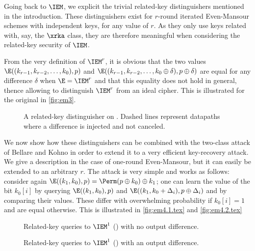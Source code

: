 Going back to $\IEM$, we explicit the
trivial related-key distinguishers mentioned in the introduction. These distinguishers exist
for $r$-round iterated Even-Mansour schemes with independent keys, for any value of $r$.
As they only use keys related with, say, the $\xrka$ class,
they are therefore meaningful when considering the related-key security of $\IEM$.

From the very definition of $\IEM^r$, it
is obvious that the two values $\E((k_{r-1}, k_{r-2},\linebreak[1] \ldots, k_0), p)$
and $\E((k_{r-1}, k_{r-2}, \ldots, k_0 \oplus \delta), p \oplus \delta)$ are equal for any
difference $\delta$ when
$\E = \IEM^r$ and that this equality does not hold in general, thence allowing to distinguish
$\IEM^r$ from an ideal cipher. This is illustrated for the original \EM in \autoref{fig:em3}.

\begin{figure}[!htb]
\begin{center}

\caption[A related-key distinguisher on \EM.]{A related-key distinguisher on \EM. Dashed lines represent datapaths where a difference is injected and not canceled.\label{fig:em3}}
\end{center}
\end{figure}

\medskip

We now show how these distinguishers can be combined with the two-class attack of Bellare and Kohno
in order to extend it to a very efficient key-recovery attack. We give a description in the case of one-round
Even-Mansour, but it can easily be extended to an arbitrary $r$. The attack is very simple and works
as follows: consider again $\E((k_1, k_0), p) = \Perm(p \oplus k_0) \oplus k_1$; one can learn
the value of the bit $k_0[i]$ by querying $\E((k_1, k_0), p)$ and
$\E((k_1, k_0 + \Delta_i), p \oplus \Delta_i)$
and by comparing their values. These  differ with overwhelming probability
if $k_0[i] = 1$ and are equal otherwise.
This is illustrated in \autoref{fig:em4.1.tex} and \autoref{fig:em4.2.tex}

\begin{figure}[!htb]
\begin{center}

\caption{Related-key queries to $\IEM^1$ (\ie \EM) with no output difference.\label{fig:em4.1.tex}}
\end{center}
\end{figure}

\begin{figure}[!htb]
\begin{center}

\caption{Related-key queries to $\IEM^1$ (\ie \EM) with an output difference.\label{fig:em4.2.tex}}
\end{center}
\end{figure}


